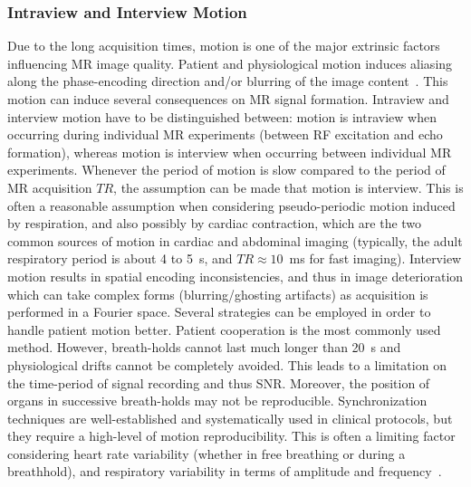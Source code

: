 \subsubsection{Intraview and Interview Motion} \label{SubSubSec:IntraviewandInterviewMotion}
Due to the long acquisition times, motion is one of the major extrinsic factors influencing MR image quality. Patient and physiological motion induces aliasing along the phase-encoding direction and/or blurring of the image content~\cite{Kuestner2022}.
This motion can induce several consequences on MR signal formation. Intraview and interview motion have to be distinguished between: motion is intraview when occurring during individual MR experiments (between RF excitation and echo formation), whereas motion is interview when occurring between individual MR experiments. Whenever the period of motion is slow compared to the period of MR acquisition 
$TR$, the assumption can be made that motion is interview. This is often a reasonable assumption when considering pseudo-periodic motion induced by respiration, and also possibly by cardiac contraction, which are the two common sources of motion in cardiac and abdominal imaging (typically, the adult respiratory period is about 4 to 5~s, and $TR \approx 10$~ms for fast imaging). Interview motion results in spatial encoding inconsistencies, and thus in image deterioration which can take complex forms (blurring/ghosting artifacts) as acquisition is performed in a Fourier space. Several strategies can be employed in order to handle patient motion better. Patient cooperation is the most commonly used method. However, breath-holds cannot last much longer than 20~s and physiological drifts cannot be completely avoided. This leads to a limitation on the time-period of signal recording and thus SNR. Moreover, the position of organs in successive breath-holds may not be reproducible. Synchronization techniques are well-established and systematically used in clinical protocols, but they require a high-level of motion reproducibility. This is often a limiting factor considering heart rate variability (whether in free breathing or during a breathhold), and respiratory variability in terms of amplitude and frequency~\cite{GRICS}. 

